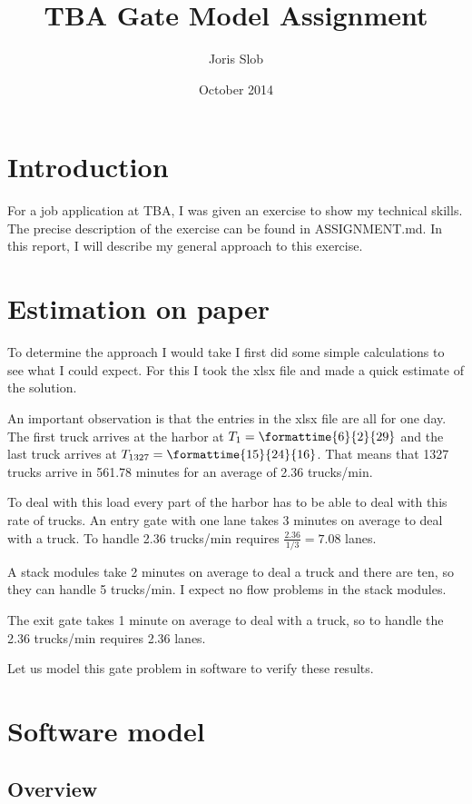 \documentclass{article}
\begin{document}
\title{TBA Gate Model Assignment}
\author{Joris Slob}
\date{October 2014}
\maketitle

\section{Introduction}

For a job application at TBA, I was given an exercise to show my
technical skills. The precise description of the exercise can be found
in ASSIGNMENT.md. In this report, I will describe my general approach
to this exercise.

\section{Estimation on paper}

To determine the approach I would take I first did some simple
calculations to see what I could expect. For this I took the xlsx file
and made a quick estimate of the solution.

An important observation is that the entries in the xlsx file are all
for one day. The first truck arrives at the harbor at $T_1 =
\mbox{\formattime{6}{2}{29}}$ and the last truck arrives at $T_{1327}
= \mbox{\formattime{15}{24}{16}}$. That means that 1327 trucks arrive
in 561.78 minutes for an average of 2.36 trucks/min.

To deal with this load every part of the harbor has to be able to deal
with this rate of trucks. An entry gate with one lane takes 3 minutes
on average to deal with a truck. To handle 2.36 trucks/min requires
$\frac{2.36}{1/3} = 7.08$ lanes.

A stack modules take 2 minutes on average to deal a truck and there
are ten, so they can handle 5 trucks/min. I expect no flow problems in
the stack modules.

The exit gate takes 1 minute on average to deal with a truck, so to
handle the 2.36 trucks/min requires 2.36 lanes.

Let us model this gate problem in software to verify these results.

\section{Software model}

\subsection{Overview}
\end{document}

